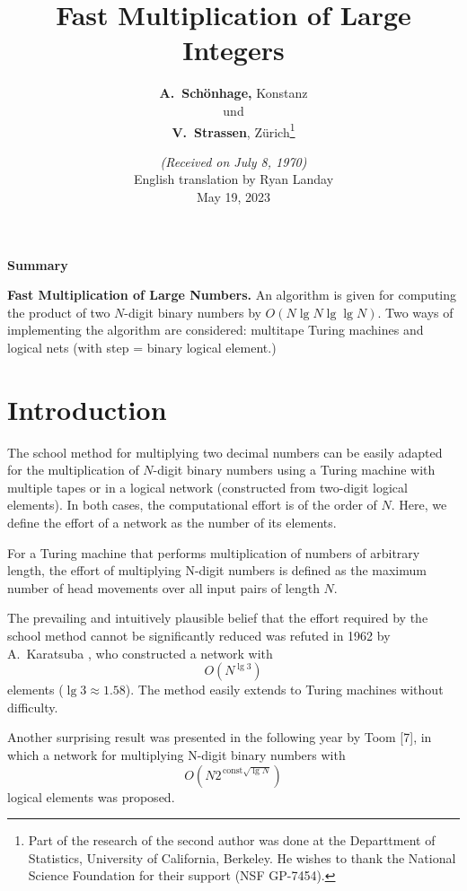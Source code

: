 \documentclass{article}
\begin{document}
\title{Fast Multiplication of Large Integers}
\author{\textbf{A.\ Schönhage,} Konstanz \\ und \\ \textbf{V.\ Strassen}, Zürich\footnote{Part of the research of the second author was done at the Departtment of Statistics, University of California, Berkeley. He wishes to thank the National Science Foundation for their support (NSF GP-7454).}}
\date{\textit{(Received on July 8, 1970)} \\ \bigskip English translation by Ryan Landay \\ May 19, 2023}
\renewcommand{\thefootnote}{\arabic{footnote}}
\maketitle
\begin{center}
\textbf{Summary}
\end{center}

\textbf{Fast Multiplication of Large Numbers.} An algorithm is given for computing the product of two $N$-digit binary numbers by $O(N \lg N \lg \lg N)$. Two ways of implementing the algorithm are considered: multitape Turing machines and logical nets (with step = binary logical element.)

\section{Introduction}

The school method for multiplying two decimal numbers can be easily adapted for the multiplication of $N$-digit binary numbers using a Turing machine with multiple tapes or in a logical network (constructed from two-digit logical elements). In both cases, the computational effort is of the order of $N$. Here, we define the effort of a network as the number of its elements.

For a Turing machine that performs multiplication of numbers of arbitrary length, the effort of multiplying N-digit numbers is defined as the maximum number of head movements over all input pairs of length $N$.

The prevailing and intuitively plausible belief that the effort required by the school method cannot be significantly reduced was refuted in 1962 by A.\ Karatsuba \cite{karatsuba}, who constructed a network with
\[
O\left(N^{\lg 3}\right)
\]
elements ($\lg 3 \approx 1.58$). The method easily extends to Turing machines without difficulty.

Another surprising result was presented in the following year by Toom [7], in which a network for multiplying N-digit binary numbers with
\[
O(N 2^{\, \text{const} \sqrt{\lg N}})
\] logical elements was proposed.
\end{document}
